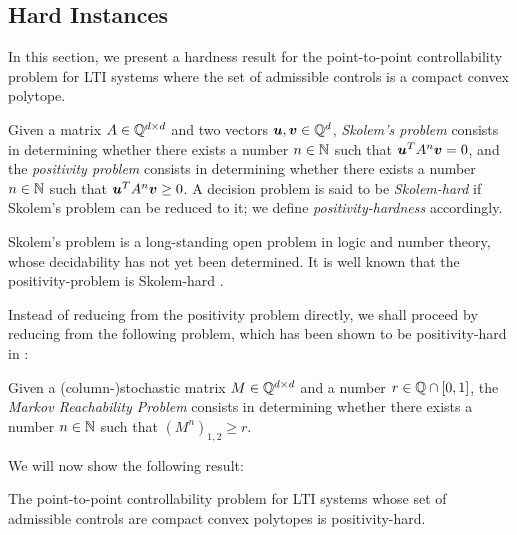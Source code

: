 \subsection{Hard Instances}

In this section, we present a hardness result for the point-to-point controllability problem for LTI systems where the set of admissible controls is a compact convex polytope.

\begin{definition}
Given a matrix $A \in \mathbb{Q}^{d \times d}$ and two vectors
$\boldsymbol{u}, \boldsymbol{v} \in \mathbb{Q}^{d}$, \emph{Skolem's problem} consists in determining
whether there exists a number $n \in \mathbb{N}$ such that
$\boldsymbol{u}^{T} A^{n} \boldsymbol{v} = 0$, and the \emph{positivity problem} consists in determining whether there exists a number $n \in \mathbb{N}$ such that $\boldsymbol{u}^{T} A^{n} \boldsymbol{v} \geq 0$. A decision problem is said to be \emph{Skolem-hard} if Skolem's problem can be reduced to it; we define \emph{positivity-hardness} accordingly.
\end{definition}

Skolem's problem is a long-standing open problem in logic and number theory, whose decidability has not yet been determined. It is well known that the positivity-problem is Skolem-hard \cite{OW14:SODA}.

Instead of reducing from the positivity problem directly, we shall proceed by reducing from the following problem, which has been shown to be positivity-hard in \cite{MRP}:
\begin{definition}
Given a (column-)stochastic matrix $M \in \mathbb{Q}^{d \times d}$ and a number $r \in \mathbb{Q} \cap [0,1]$,
the \emph{Markov Reachability Problem} consists in determining whether there exists a number $n \in \mathbb{N}$ such that $\left( M^{n} \right)_{1,2} \geq r$.
\end{definition}

We will now show the following result:

\begin{theorem}
The point-to-point controllability problem for LTI systems whose set of admissible controls are compact convex polytopes is positivity-hard.
\end{theorem}

